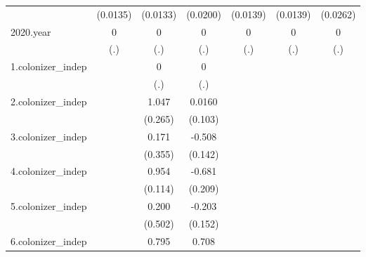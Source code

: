 {\begin{tabular}{l*{6}{c}}
            &    (0.0135)         &    (0.0133)         &    (0.0200)         &    (0.0139)         &    (0.0139)         &    (0.0262)         \\
[1em]
2020.year   &           0         &           0         &           0         &           0         &           0         &           0         \\
            &         (.)         &         (.)         &         (.)         &         (.)         &         (.)         &         (.)         \\
[1em]
1.colonizer\_indep&                     &           0         &           0         &                     &                     &                     \\
            &                     &         (.)         &         (.)         &                     &                     &                     \\
[1em]
2.colonizer\_indep&                     &       1.047\sym{**} &      0.0160         &                     &                     &                     \\
            &                     &     (0.265)         &     (0.103)         &                     &                     &                     \\
[1em]
3.colonizer\_indep&                     &       0.171         &      -0.508\sym{**} &                     &                     &                     \\
            &                     &     (0.355)         &     (0.142)         &                     &                     &                     \\
[1em]
4.colonizer\_indep&                     &       0.954\sym{***}&      -0.681\sym{**} &                     &                     &                     \\
            &                     &     (0.114)         &     (0.209)         &                     &                     &                     \\
[1em]
5.colonizer\_indep&                     &       0.200         &      -0.203         &                     &                     &                     \\
            &                     &     (0.502)         &     (0.152)         &                     &                     &                     \\
[1em]
6.colonizer\_indep&                     &       0.795         &       0.708\sym{**} &                     &                     &                     \\

\end{tabular}}

